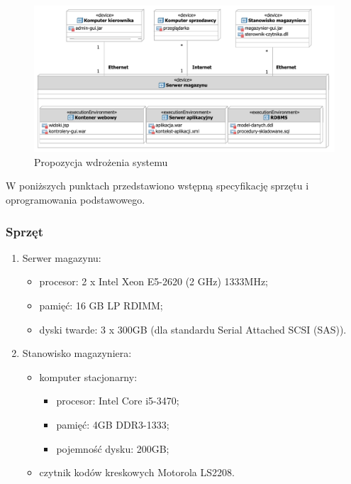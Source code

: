 \begin{figure}[p]
  \begin{center}
    \includegraphics[scale=0.7]{../img/sys/DiagramWdrozenia.pdf}
  \end{center}
  \caption{Propozycja wdrożenia systemu}
  \label{fig:DiagramWdrozenia}
\end{figure}
\FloatBarrier

W poniższych punktach przedstawiono wstępną specyfikację sprzętu i
oprogramowania podstawowego.

\subsubsection{Sprzęt}

\begin{enumerate}
\item Serwer magazynu:
  \begin{itemize}
  \item procesor: 2 x Intel Xeon E5-2620 (2 GHz) 1333MHz;
  \item pamięć: 16 GB LP RDIMM;
  \item dyski twarde: 3 x 300GB (dla standardu Serial Attached SCSI
    (SAS)).
  \end{itemize}
\item Stanowisko magazyniera:
  \begin{itemize}
  \item komputer stacjonarny:
    \begin{itemize}
    \item procesor: Intel Core i5-3470;
    \item pamięć: 4GB DDR3-1333;
    \item pojemność dysku: 200GB;
    \end{itemize}
  \item czytnik kodów kreskowych Motorola LS2208.
  \end{itemize}
\end{enumerate}

